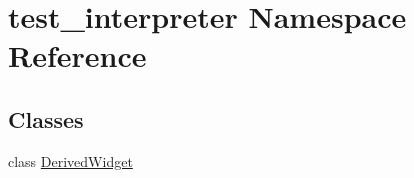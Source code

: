 \hypertarget{namespacetest__interpreter}{}\section{test\+\_\+interpreter Namespace Reference}
\label{namespacetest__interpreter}
\subsection*{Classes}
\begin{DoxyCompactItemize}
\item 
class \mbox{\hyperlink{classtest__interpreter_1_1_derived_widget}{Derived\+Widget}}
\end{DoxyCompactItemize}
